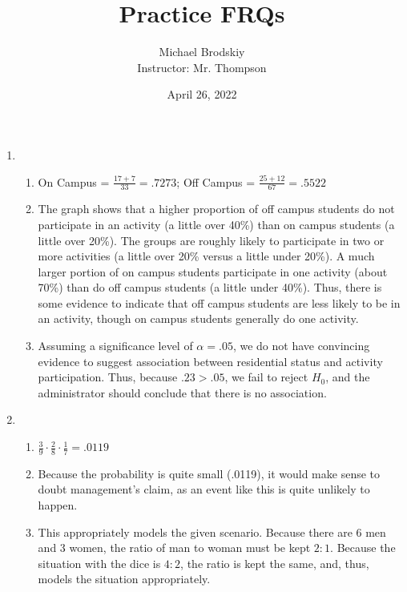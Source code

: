 \documentclass[12pt]{article}
\title{Practice FRQs}
\date{April 26, 2022}
\author{Michael Brodskiy\\ \small Instructor: Mr. Thompson}
\begin{document}
\maketitle

\begin{enumerate}

  \item

    \begin{enumerate}

      \item On Campus = $\frac{17 + 7}{33} = .7273$; Off Campus = $\frac{25 + 12}{67} = .5522$

      \item The graph shows that a higher proportion of off campus students do not participate in an activity (a little over 40\%) than on campus students (a little over 20\%). The groups are roughly likely to participate in two or more activities (a little over 20\% versus a little under 20\%). A much larger portion of on campus students participate in one activity (about 70\%) than do off campus students (a little under 40\%). Thus, there is some evidence to indicate that off campus students are less likely to be in an activity, though on campus students generally do one activity.

      \item Assuming a significance level of $\alpha = .05$, we do not have convincing evidence to suggest association between residential status and activity participation. Thus, because $.23 > .05$, we fail to reject $H_0$, and the administrator should conclude that there is no association.

    \end{enumerate}

  \item

    \begin{enumerate}

      \item $\frac{3}{9} \cdot \frac{2}{8} \cdot \frac{1}{7} = .0119$

      \item Because the probability is quite small (.0119), it would make sense to doubt management's claim, as an event like this is quite unlikely to happen.

      \item This appropriately models the given scenario. Because there are 6 men and 3 women, the ratio of man to woman must be kept $2:1$. Because the situation with the dice is $4:2$, the ratio is kept the same, and, thus, models the situation appropriately.


\end{enumerate}
\end{enumerate}
\end{document}
